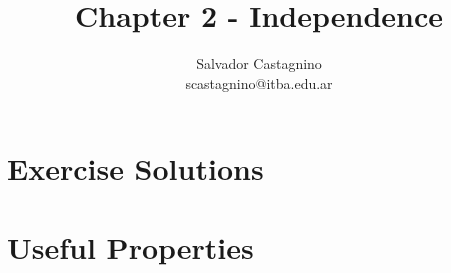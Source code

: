 \documentclass{article}
\author{Salvador Castagnino \\ scastagnino@itba.edu.ar}
\date{}
\title{Chapter 2 - Independence}
\begin{document}
\maketitle 

\section*{Exercise Solutions}

\bigbreak

\section*{Useful Properties}
\end{document}
